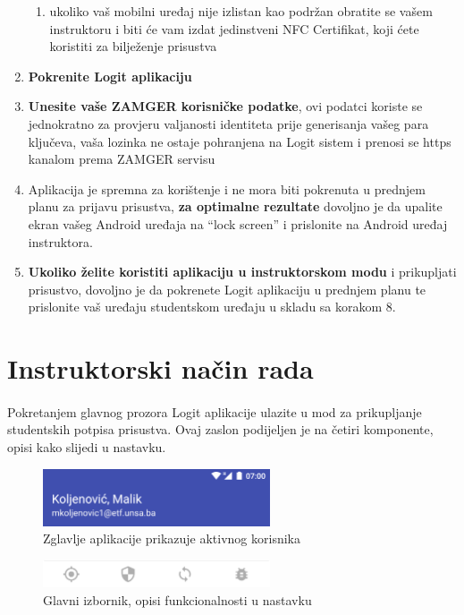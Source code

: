 \begin{enumerate}
    \begin{enumerate}
        \item ukoliko vaš mobilni uređaj nije izlistan kao podržan obratite se vašem instruktoru i biti će vam izdat jedinstveni NFC Certifikat, koji ćete koristiti za bilježenje prisustva
    \end{enumerate}
    \item \textbf{Pokrenite Logit aplikaciju}
    \item \textbf{Unesite vaše ZAMGER korisničke podatke}, ovi podatci koriste se jednokratno za provjeru valjanosti identiteta prije generisanja vašeg para ključeva, vaša lozinka ne ostaje pohranjena na Logit sistem i prenosi se https kanalom prema ZAMGER servisu
    \item Aplikacija je spremna za korištenje i ne mora biti pokrenuta u prednjem planu za prijavu prisustva, \textbf{za optimalne rezultate} dovoljno je da upalite ekran vašeg Android uređaja na “lock screen” i prislonite na Android uređaj instruktora.
    \item \textbf{Ukoliko želite koristiti aplikaciju u instruktorskom modu} i prikupljati prisustvo, dovoljno je da pokrenete Logit aplikaciju u prednjem planu te prislonite vaš uređaju studentskom uređaju u skladu sa korakom 8.
\end{enumerate}

\pagebreak[4]
\section{Instruktorski način rada}
\paragraph*{}
Pokretanjem glavnog prozora Logit aplikacije ulazite u mod za prikupljanje studentskih potpisa prisustva. Ovaj zaslon podijeljen je na četiri komponente, opisi kako slijedi u nastavku.

\begin{figure}[H]
    \centering
    \includegraphics[width=0.6\textwidth]{material/manual/01-head}
    \caption{Zglavlje aplikacije prikazuje aktivnog korisnika}
\end{figure}

\begin{figure}[H]
    \centering
    \includegraphics[width=0.6\textwidth]{material/manual/02-menu}
    \caption{Glavni izbornik, opisi funkcionalnosti u nastavku}
\end{figure}

